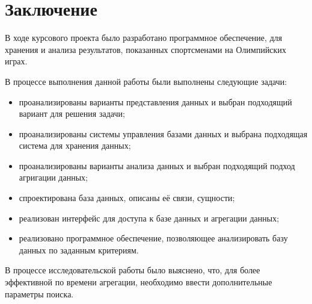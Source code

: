 \chapter{Заключение}

В ходе курсового проекта было разработано программное обеспечение, для хранения и анализа результатов, показанных спортсменами на Олимпийских играх.

В процессе выполнения данной работы были выполнены следующие задачи:

\begin{itemize}
	
	\item проанализированы варианты представления данных и выбран подходящий вариант для решения задачи;
	
	\item проанализированы системы управления базами данных и выбрана подходящая система для хранения данных;
	
	\item проанализированы варианты анализа данных и выбран подходящий подход агригации данных;
	
	\item спроектирована база данных, описаны её связи, сущности;
	
	\item реализован интерфейс для доступа к базе данных и агрегации данных;
	
	\item реализовано программное обеспечение, позволяющее анализировать базу данных по заданным критериям.
	
\end{itemize}

В процессе исследовательской работы было выяснено, что, для более эффективной по времени агрегации,
необходимо ввести дополнительные параметры поиска.